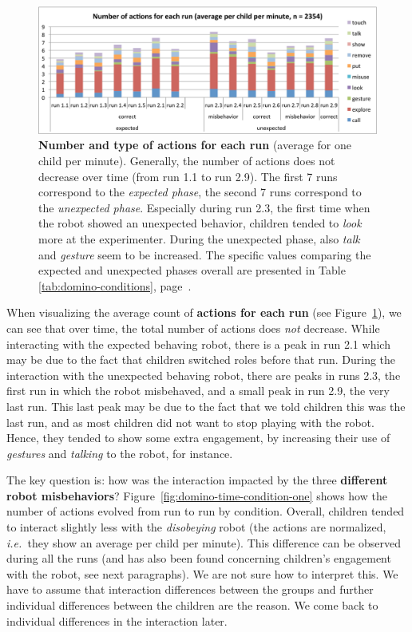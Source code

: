 \documentclass{sig-alternate}
\newcommand{\ie}{{\textit{i.e.~}}}
\begin{document}
\begin{figure}[!b] 
\centering 
\includegraphics[width=0.99\columnwidth]{domino-time-all.pdf} 
\caption[Number and Type of Actions for Each Run]{\small \textbf{Number and type of actions for each run} (average for one child per minute). Generally, the number of actions does not decrease over time (from run 1.1 to run 2.9). The first 7 runs correspond to the \textit{expected phase}, the second 7 runs correspond to the \textit{unexpected phase}. Especially during run 2.3, the first time when the robot showed an unexpected behavior, children tended to \textit{look} more at the experimenter. During the unexpected phase, also \textit{talk} and \textit{gesture} seem to be increased. The specific values comparing the expected and unexpected phases overall are presented in Table \ref{tab:domino-conditions}, page~\pageref{tab:domino-conditions}.}
\label{fig:domino-time-all} 
\end{figure}		

When visualizing the average count of \textbf{actions for each run} (see
Figure~\ref{fig:domino-time-all}), we can see that over time, the total number
of actions does \textit{not} decrease. While interacting with the expected
behaving robot, there is a peak in run 2.1 which may be due to the fact that
children switched roles before that run. During the interaction with the
unexpected behaving robot, there are peaks in runs 2.3, the first run in which
the robot misbehaved, and a small peak in run 2.9, the very last run. This last
peak may be due to the fact that we told children this was the last run, and as
most children did not want to stop playing with the robot. Hence, they tended to
show some extra engagement, by increasing their use of \textit{gestures} and
\textit{talking} to the robot, for instance.

The key question is: how was the interaction impacted by the three
\textbf{different robot misbehaviors}?
Figure~\ref{fig:domino-time-condition-one} shows how the number of actions
evolved from run to run by condition. Overall, children tended to interact
slightly less with the \textit{disobeying} robot (the actions are normalized,
\ie they show an average per child per minute). This difference can be observed
during all the runs (and has also been found concerning children's engagement
with the robot, see next paragraphs). We are not sure how to interpret this. We
have to assume that interaction differences between the groups and further
individual differences between the children are the reason. We come back to
individual differences in the interaction later.  
\end{document}
